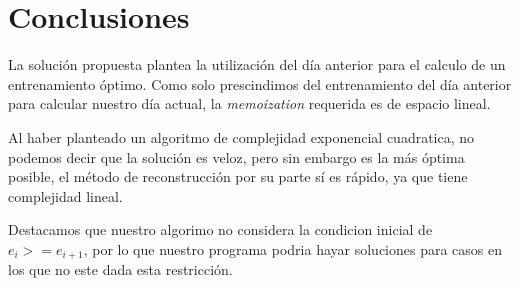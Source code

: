 \section{Conclusiones}

La soluci\'on propuesta plantea la utilización del día anterior para el calculo de un entrenamiento óptimo. 
Como solo prescindimos del entrenamiento del d\'ia anterior para calcular nuestro d\'ia actual, la \textit{memoization} requerida es de espacio lineal.

Al haber planteado un algoritmo de complejidad exponencial cuadratica, no podemos decir que la soluci\'on es veloz, pero sin embargo es la m\'as \'optima posible, el m\'etodo de reconstrucci\'on por su parte s\'i es r\'apido, ya que tiene complejidad lineal.

Destacamos que nuestro algorimo no considera la condicion inicial de $e_i >= e_{i+1}$, por lo que nuestro programa podria hayar soluciones para casos en los que no este dada esta restricci\'on.
